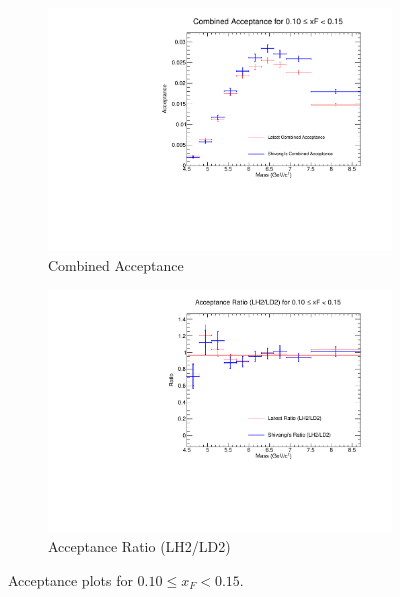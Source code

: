 \documentclass[11pt]{article}
\begin{document}
\begin{figure}[p]
\begin{subfigure}[b]{0.48\textwidth}
       \includegraphics[width=\linewidth]{./acceptancePlots/Combined_acceptance_xF_bin_2.pdf}
       \caption{Combined Acceptance}
    \end{subfigure}\hfill
    \begin{subfigure}[b]{0.48\textwidth}
       \includegraphics[width=\linewidth]{./acceptancePlots/Acceptance_ratio_xF_bin_2.pdf}
       \caption{Acceptance Ratio (LH2/LD2)}
    \end{subfigure}
    \caption{Acceptance plots for $0.10 \le x_F < 0.15$.}
\end{figure}
\end{document}
